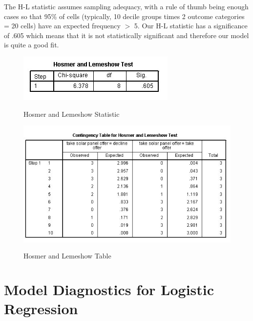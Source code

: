 \documentclass[a4paper,12pt]{article}
\begin{document}
The H-L statistic assumes sampling adequacy, with a rule of thumb being enough cases so that 95\% of cells (typically, 10 decile groups times 2 outcome categories = 20 cells) have an expected frequency $>$ 5. Our H-L statistic has a significance of .605 which means that it is not statistically significant and therefore our model is quite a
good fit.
\begin{figure}[h!]
	\begin{center}
		\includegraphics[scale=0.6]{images/Logistic7A}\\
		\caption{Hosmer and Lemeshow Statistic}
	\end{center}
\end{figure}


\begin{figure}[h!]
	\begin{center}
		\includegraphics[scale=0.6]{images/Logistic6}\\
		\caption{Hosmer and Lemeshow Table}
	\end{center}
\end{figure}


\section{Model Diagnostics for Logistic Regression}

\end{document}
